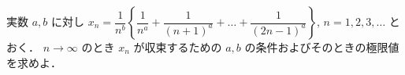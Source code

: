 \documentclass[../../main.tex]{subfiles}
\begin{document}
実数 $a, b$ に対し $\displaystyle x_n = \dfrac{1}{n^b} \left\{ \dfrac{1}{n^a} + \dfrac{1}{(n+1)^a} + \dots + \dfrac{1}{(2n-1)^a} \right\}$, $n=1,2,3,\dots$ とおく．
$n \to \infty$ のとき $x_n$ が収束するための $a, b$ の条件およびそのときの極限値を求めよ．
\end{document}
